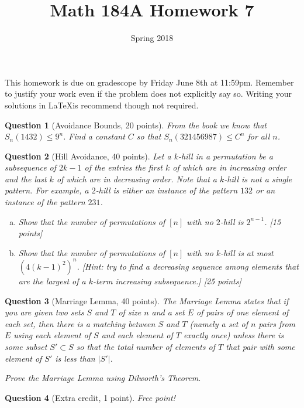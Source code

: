 \documentclass{article}
\title{Math 184A Homework 7}
\date{Spring 2018}
\newtheorem{ques}{Question}
\begin{document}
\maketitle

This homework is due on gradescope by Friday June 8th at 11:59pm. Remember to justify your work even if the problem does not explicitly say so. Writing your solutions in \LaTeX is recommend though not required.

\begin{ques}[Avoidance Bounds, 20 points]
From the book we know that $S_n(1432)\leq 9^n$. Find a constant $C$ so that $S_n(321456987)\leq C^n$ for all $n$.
\end{ques}

\begin{ques}[Hill Avoidance, 40 points]
Let a $k$-hill in a permutation be a subsequence of $2k-1$ of the entries the first $k$ of which are in increasing order and the last $k$ of which are in decreasing order. Note that a $k$-hill is not a single pattern. For example, a $2$-hill is either an instance of the pattern $132$ or an instance of the pattern $231$.
\begin{enumerate}[(a)]
\item Show that the number of permutations of $[n]$ with no $2$-hill is $2^{n-1}$. [15 points]
\item Show that the number of permutations of $[n]$ with no $k$-hill is at most $(4(k-1)^2)^n$. [Hint: try to find a decreasing sequence among elements that are the largest of a $k$-term increasing subsequence.] [25 points]
\end{enumerate}
\end{ques}

\begin{ques}[Marriage Lemma, 40 points]
The Marriage Lemma states that if you are given two sets $S$ and $T$ of size $n$ and a set $E$ of pairs of one element of each set, then there is a matching between $S$ and $T$ (namely a set of $n$ pairs from $E$ using each element of $S$ and each element of $T$ exactly once) unless there is some subset $S'\subset S$ so that the total number of elements of $T$ that pair with some element of $S'$ is less than $|S'|$.

Prove the Marriage Lemma using Dilworth's Theorem.
\end{ques}

\begin{ques}[Extra credit, 1 point]
Free point!
\end{ques}
\end{document}
